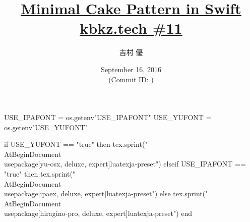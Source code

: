 \hypersetup{colorlinks,linkcolor=,urlcolor=links}

\beamertemplatenavigationsymbolsempty


\usepackage{luacode}
\usepackage{luatexja}
\usepackage{pgfpages}
\usepackage[osf]{mathpazo}

\begin{luacode*}
  USE_IPAFONT = os.getenv"USE_IPAFONT"
  USE_YUFONT = os.getenv"USE_YUFONT"
  
  if USE_YUFONT == "true" then
    tex.sprint("\\AtBeginDocument{\\usepackage[yu-osx, deluxe, expert]{luatexja-preset}}")
  elseif USE_IPAFONT == "true" then
    tex.sprint("\\AtBeginDocument{\\usepackage[ipaex, deluxe, expert]{luatexja-preset}}")
  else
    tex.sprint("\\AtBeginDocument{\\usepackage[hiragino-pro, deluxe, expert]{luatexja-preset}}")
  end
\end{luacode*}

\usepackage{epigraph}
\usepackage{etoolbox}
\usepackage{tikz}
\usepackage{framed}
\usepackage{libertine}
\usepackage{amsmath}
\usepackage{mathtools}

\renewcommand{\kanjifamilydefault}{\gtdefault}


\setmainfont[Numbers=OldStyle, BoldFont=Palatino Bold]{Palatino}
\setsansfont{CMU Sans Serif}
\setmonofont{CMU Typewriter Text}



\title[\href{http://qiita.com/yyu/items/193cb9fd782d226f50fc}{Minimal Cake Pattern in Swift}]{%
  \href{http://qiita.com/yyu/items/193cb9fd782d226f50fc}{Minimal Cake Pattern in Swift} \\
  {\normalsize \href{http://kbkz.connpass.com/event/37480}{kbkz.tech \#11}}
}
\author{吉村 優}
\date[September 16, 2016]{%
  September 16, 2016 \\%
  {\footnotesize (Commit ID: \GITAbrHash)}
}

